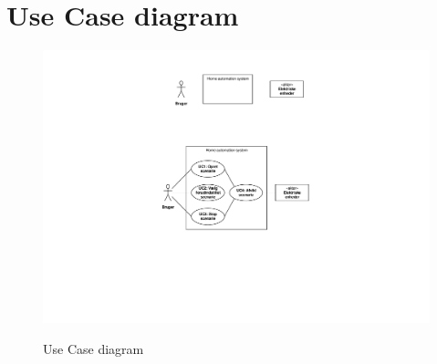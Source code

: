 \section{Use Case diagram}
\begin{figure}[h]
\centering
\includegraphics[scale=1,clip=true,trim=220 200 260 209]{../Kravspecifikation/actor.pdf}
\label{fig:uc_diagram}
\caption{Use Case diagram}
\end{figure}

\clearpage

